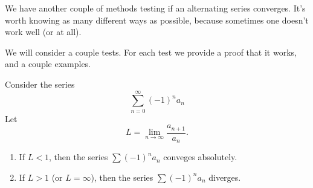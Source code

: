\M
We have another couple of methods testing if an alternating
series converges. It's worth knowing as many different ways as
possible, because sometimes one doesn't work well (or at all).

We will consider a couple tests. For each test we provide a
proof that it works, and a couple examples.

Consider the series 
\begin{equation}
\sum^{\infty}_{n=0}(-1)^{n}a_{n}
\end{equation}
Let
\begin{equation}
L = \lim_{n\to\infty}\frac{a_{n+1}}{a_{n}}.
\end{equation}
\begin{enumerate}
\item If $L<1$, then the series $\sum (-1)^{n}a_{n}$ conveges
  absolutely.
\item If $L>1$ (or $L=\infty$), then the series
  $\sum (-1)^{n}a_{n}$ diverges.
\end{enumerate}

